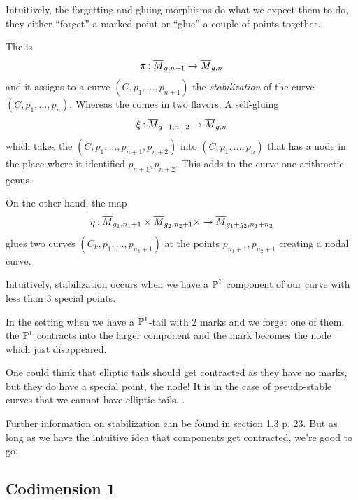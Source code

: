 \documentclass[12pt]{memoir}
\begin{document}
Intuitively, the forgetting and gluing morphisms do what we expect them to do, they either ``forget'' a marked point or ``glue'' a couple of points together.  

\begin{Def}
    The  is 
    $$\pi\mathbin{:}\overline M_{g,n+1}\to\overline M_{g,n}$$ 
    and it assigns to a curve $(C,p_1,\dots,p_{n+1})$ the \emph{stabilization} of the curve $(C,p_1,\dots,p_n)$. Whereas the  comes in two flavors. A self-gluing 
    $$\xi\mathbin{:}\overline M_{g-1,n+2}\to\overline M_{g,n}$$
    which takes the $(C,p_1,\dots,p_{n+1},p_{n+2})$ into $(C,p_1,\dots,p_n)$ that has a node in the place where it identified $p_{n+1},p_{n+2}$. This adds to the curve one arithmetic genus.\par
    On the other hand, the map 
    $$\eta\mathbin{:}\overline M_{g_1,n_1+1}\times\overline M_{g_2,n_2+1}\times\to\overline M_{g_1+g_2,n_1+n_2}$$
    glues two curves $(C_k,p_1,\dots,p_{n_k+1})$ at the points $p_{n_1+1},p_{n_2+1}$ creating a nodal curve.
\end{Def}

Intuitively, stabilization occurs when we have a $\mathbb{P}^1$ component of our curve with less than 3 special points.

\begin{Ex}
    In the setting when we have a $\mathbb{P}^1$-tail with 2 marks and we forget one of them, the $\mathbb{P}^1$ contracts into the larger component and the mark becomes the node which just disappeared.
\end{Ex}

\begin{Rmk}
    One could think that elliptic tails should get contracted as they have no marks, but they do have a special point, the node! It is in the case of pseudo-stable curves that we cannot have elliptic tails. .
\end{Rmk}

Further information on stabilization can be found in \cite{GreenBookKockVainsencher} section 1.3 p. 23. But as long as we have the intuitive idea that components get contracted, we're good to go.

\subsection{Codimension 1}
\end{document}
